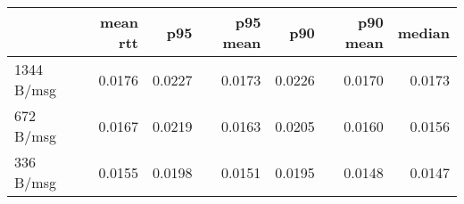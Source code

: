\begin{tabular}{l|rrrrrr}
\rowcolor{gray!50}
 & mean rtt & p95 & p95 mean & p90 & p90 mean & median\\\hline
1344 B/msg & 0.0176 & 0.0227 & 0.0173 & 0.0226 & 0.0170 & 0.0173 \\
672 B/msg & 0.0167 & 0.0219 & 0.0163 & 0.0205 & 0.0160 & 0.0156 \\
336 B/msg & 0.0155 & 0.0198 & 0.0151 & 0.0195 & 0.0148 & 0.0147 \\
\end{tabular}
